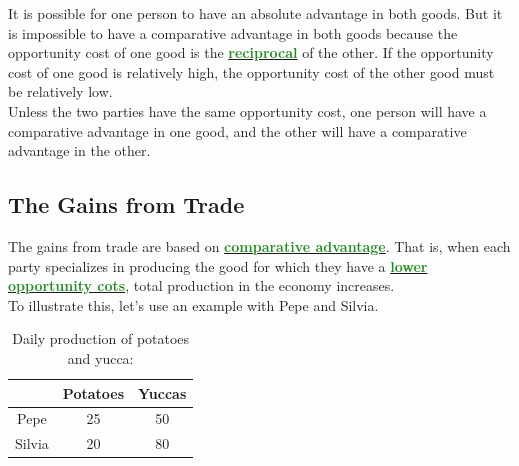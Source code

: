 \documentclass[11pt]{article}\usepackage[]{graphicx}\usepackage[]{color}
\theoremstyle{definition}
\newcommand{\dd}[1]{{\underline{\textbf{\textcolor{ForestGreen}{#1}}}}}
\begin{document}
	
	It is possible for one person to have an absolute advantage in both goods. But it is impossible to have a comparative advantage in both goods because the opportunity cost of one good is the \dd{reciprocal} of the other. If the opportunity cost of one good is relatively high, the opportunity cost of the other good must be relatively low. 
	\\
	
	Unless the two parties have the same opportunity cost, one person will have a comparative advantage in one good, and the other will have a comparative advantage in the other.
	
	\subsection{The Gains from Trade}
	
	The gains from trade are based on \dd{comparative advantage}. That is, when each party specializes in producing the good for which they have a  \dd{lower opportunity cots}, total production in the economy increases. 
	\\
	
	To illustrate this, let's use an example with Pepe and Silvia.
	
	\begin{table}[H]
		\caption*{Daily production of potatoes and yucca:}
		\centering
		\begin{tabular}{ c|c|c|}        
			
			& Potatoes & Yuccas \\
			\hline
			Pepe & 25 & 50  \\
			
			Silvia  & 20 & 80  \\
			
		\end{tabular}
	\end{table}
	
\end{document}
